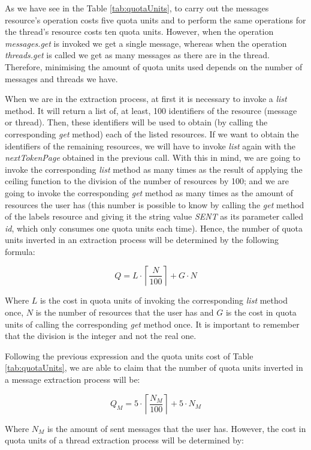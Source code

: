 As we have see in the Table \ref{tab:quotaUnits}, to carry out the messages resource's operation costs five quota units and to perform the same operations for the thread's resource costs ten quota units. However, when the operation \textit{messages.get} is invoked we get a single message, whereas when the operation \textit{threads.get} is called we get as many messages as there are in the thread. Therefore, minimising the amount of quota units used depends on the number of messages and threads we have.

When we are in the extraction process, at first it is necessary to invoke a \textit{list} method. It will return a list of, at least, 100 identifiers of the resource (message or thread). Then, these identifiers will be used to obtain (by calling the corresponding \textit{get} method) each of the listed resources. If we want to obtain the identifiers of the remaining resources, we will have to invoke \textit{list} again with the \textit{nextTokenPage} obtained in the previous call. With this in mind, we are going to invoke the corresponding \textit{list} method as many times as the result of applying the ceiling function to the division of the number of resources by 100; and we are going to invoke the corresponding \textit{get} method as many times as the amount of resources the user has (this number is possible to know by calling the \textit{get} method of the labels resource and giving it the string value \textit{SENT} as its parameter called \textit{id}, which only consumes one quota units each time). Hence, the number of quota units inverted in an extraction process will be determined by the following formula:

$$
Q = L\cdot\left\lceil\frac{N}{100}\right\rceil+G\cdot N
$$

Where $L$ is the cost in quota units of invoking the corresponding \textit{list} method once, $N$ is the number of resources that the user has and $G$ is the cost in quota units of calling the corresponding \textit{get} method once. It is important to remember that the division is the integer and not the real one.

Following the previous expression and the quota units cost of Table \ref{tab:quotaUnits}, we are able to claim that the number of quota units inverted in a message extraction process will be:

$$
Q_M = 5\cdot\left\lceil\frac{N_M}{100}\right\rceil+5\cdot N_M
$$

Where $N_M$ is the amount of sent messages that the user has. However, the cost in quota units of a thread extraction process will be determined by:

